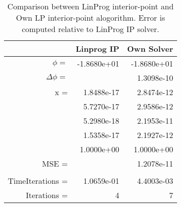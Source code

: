 \begin{table}[ht]
\centering
\begin{tabular}{rrr}
\toprule
 & Linprog IP & Own Solver \\
\midrule
$\phi =$ & -1.8680e+01 & -1.8680e+01 \\
$\Delta \phi =$ &  & 1.3098e-10 \\
x = & 1.8488e-17 & 2.8474e-12 \\
 & 5.7270e-17 & 2.9586e-12 \\
 & 5.2980e-18 & 2.1953e-11 \\
 & 1.5358e-17 & 2.1927e-12 \\
 & 1.0000e+00 & 1.0000e+00 \\
MSE = &  & 1.2078e-11 \\
 &  &  \\
TimeIterations = & 1.0659e-01 & 4.4003e-03 \\
Iterations = & 4 & 7 \\
\bottomrule
\end{tabular}
\caption{Comparison between LinProg interior-point and Own LP interior-point alogorithm. Error is computed relative to LinProg IP solver.}
\label{table:ex3_objective_comp}
\end{table}
